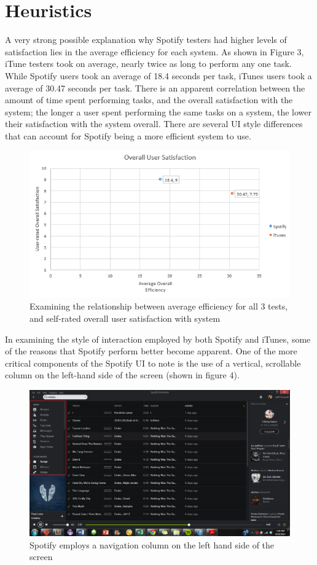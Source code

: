 \documentclass[12pt]{report}
\begin{document}
\section{Heuristics}

A very strong possible explanation why Spotify testers had higher levels of satisfaction lies in the average efficiency for each system. As shown in Figure 3, iTune testers took on average, nearly twice as long to perform any one task. While Spotify users took an average of 18.4 seconds per task, iTunes users took a average of 30.47 seconds per task. There is an apparent correlation between the amount of time spent performing tasks, and the overall satisfaction with the system; the longer a user spent performing the same tasks on a system, the lower their satisfaction with the system overall. There are several UI style differences that can account for Spotify being a more efficient system to use.

\begin{figure}[H]
	\centering
	\includegraphics[width=.75\textwidth]{chart3.png}
	\caption{Examining the relationship between average efficiency for all 3 tests, and self-rated overall user satisfaction with system}
\end{figure}

In examining the style of interaction employed by both Spotify and iTunes, some of the reasons that Spotify perform better become apparent. One of the more critical components of the Spotify UI to note is the use of a vertical, scrollable column on the left-hand side of the screen (shown in figure 4). 

\begin{figure}[H]
	\centering
	\includegraphics[width=\textwidth]{chart4.png}
	\caption{Spotify employs a navigation column on the left hand side of the screen}
\end{figure}
\end{document}
